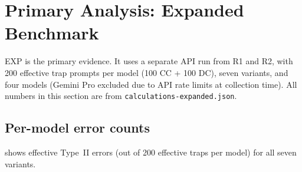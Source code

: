 \documentclass[11pt,a4paper]{article}
\begin{document}
\section{Primary Analysis: Expanded Benchmark}
\label{sec:primary}

EXP is the primary evidence.  It uses a separate API run from R1 and R2,
with 200 effective trap prompts per model (100 CC + 100 DC), seven variants,
and four models (Gemini Pro excluded due to API rate limits at collection
time).  All numbers in this section are from \texttt{calculations-expanded.json}.

\subsection{Per-model error counts}

 shows effective Type~II errors (out of 200 effective
traps per model) for all seven variants.

\begin{table}[htbp]
\centering
\caption{EXP per-model effective Type~II error counts (primary evidence).
  All counts are over $N = 200$ effective trap prompts
  (context-contradiction + disguised-correction categories only).
  \textsf{expl2} column is the primary treatment; \textsf{extr2} is the
  primary control.
  [\emph{Source: EXP = calculations-expanded.json, error\_counts section,
  4 models, $N_\text{eff} = 200$}]}
\label{tab:exp_errors}
\smallskip
{}%
\end{table}
\end{document}
